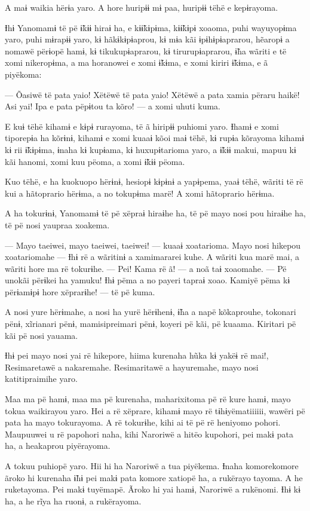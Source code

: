A maɨ waikia hërɨa yaro. A hore huripɨɨ mɨ paa, huripɨɨ tëhë e
kepɨrayoma. 

Ɨhɨ Yanomamɨ të pë ɨ̃kɨɨ hiraɨ ha, e kɨɨ̃kɨpɨma, kɨɨ̃kɨpɨ xoaoma, puhi
wayuyopɨma yaro, puhi mɨrapɨɨ yaro, kɨ hãkɨkɨpɨaprou, kɨ mɨa kãi
ɨpɨhɨpɨaprarou, hẽaropɨ a nomawë përɨopë hamɨ, kɨ tikukupɨaprarou, kɨ
tirurupɨaprarou, ɨ̃ha wãriti e të xomi nikeropɨma, a ma horanowei e xomi
ɨ̃kɨma, e xomi kiriri ɨ̃kɨma, e ã piyëkoma:

--- Õasiwë të pata yaio! Xëtëwë të pata yaio! Xëtëwë a pata xamia përaru
haikë! Asi yai! Ipa e pata pëpɨtou ta kõro! --- a xomi uhuti kuma. 

E kuɨ tëhë kihamɨ e kɨpɨ rurayoma, të ã hiripɨɨ puhiomi yaro. Ɨhamɨ e
xomi tiporepɨa ha kõrɨnɨ, kihamɨ e xomi kuaaɨ kõoi maɨ tëhë, kɨ rupɨa
kõrayoma kihamɨ kɨ rii ɨ̃kɨpɨma, ɨnaha kɨ kupɨama, kɨ huxupɨtarioma yaro,
a ɨ̃kɨɨ makui, mapuu kɨ kãi hanomi, xomi kuu pëoma, a xomi ɨ̃kɨɨ pëoma. 

Kuo tëhë, e ha kuokuopo hërɨnɨ, hesiopɨ kɨpɨnɨ a yapɨpema, yaaɨ tëhë,
wãriti të rë kui a hãtoprario hërɨma, a no tokupɨma marë! A xomi
hãtoprario hërɨma. 

A ha tokurɨnɨ, Yanomamɨ të pë xëpraɨ hiraɨhe ha, të pë mayo nosi pou
hiraɨhe ha, të pë nosi yaupraa xoakema. 

--- Mayo taeiwei, mayo taeiwei, taeiwei! --- kuaaɨ xoatarioma. Mayo nosi
hikepou xoatariomahe --- Ɨhɨ rë a wãritinɨ a xamimararei kuhe. A wãriti
kua marë mai, a wãriti hore ma rë tokurɨhe. --- Pei! Kama rë ã! --- a
noã taɨ xoaomahe. --- Pë unokãi përɨkei ha yamuku! Ɨhɨ pëma a no payeri
tapraɨ xoao. Kamiyë pëma kɨ përɨamɨpɨ hore xëprarɨhe! --- të pë kuma. 

A nosi yure hërɨmahe, a nosi ha yurë hërɨhenɨ, ɨ̃ha a napë kõkaprouhe,
tokonari pënɨ, xĩrianari pënɨ, mamisipreimari pënɨ, koyeri pë kãi, pë
kuaama. Kiritari pë kãi pë nosi yauama. 

Ɨhɨ pei mayo nosi yai rë hikepore, hiima kurenaha hũka kɨ yakëɨ rë mai!,
Resimaretawë a nakaremahe. Resimaritawë a hayuremahe, mayo nosi
katitipraimihe yaro. 

Maa ma pë hamɨ, maa ma pë kurenaha, maharixitoma pë rë kure hamɨ, mayo
tokua waikirayou yaro. Hei a rë xëprare, kihamɨ mayo rë tɨhɨyëmatiiiiii,
wawëri pë pata ha mayo tokurayoma. A rë tokurɨhe, kihi ai të pë rë
heniyomo pohori. Maupuuwei u rë papohori naha, kihi Naroriwë a hitëo
kupohori, pei makɨ pata ha, a heakaprou piyërayoma. 

A tokuu puhiopë yaro. Hii hi ha Naroriwë a tua piyëkema. Ɨnaha
komorekomore ãroko hi kurenaha ɨ̃hɨ pei makɨ pata komore xatiopë ha, a
rukërayo tayoma. A he ruketayoma. Pei makɨ tuyëmapë. Ãroko hi yai hamɨ,
Naroriwë a rukënomi. Ɨhɨ kɨ ha, a he rĩya ha ruonɨ, a rukërayoma. 

